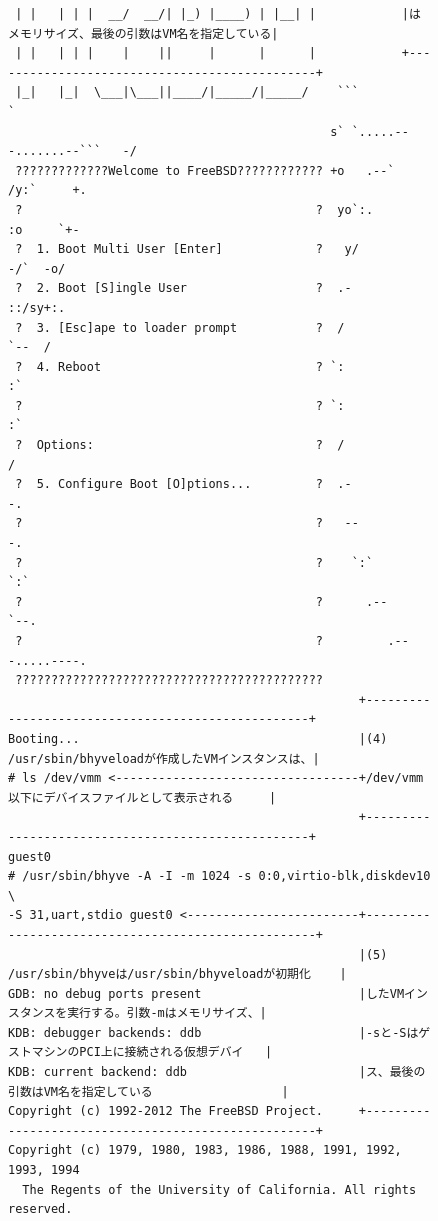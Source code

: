 \begin{figure}
{\begin{verbatim}
 | |   | | |  __/  __/| |_) |____) | |__| |            |はメモリサイズ、最後の引数はVM名を指定している|
 | |   | | |    |    ||     |      |      |            +----------------------------------------------+
 |_|   |_|  \___|\___||____/|_____/|_____/    ```                       `
                                             s` `.....---.......--```   -/
 ?????????????Welcome to FreeBSD???????????? +o   .--`         /y:`     +.
 ?                                         ?  yo`:.            :o     `+-
 ?  1. Boot Multi User [Enter]             ?   y/               -/`  -o/
 ?  2. Boot [S]ingle User                  ?  .-                  ::/sy+:.
 ?  3. [Esc]ape to loader prompt           ?  /                     `--  /
 ?  4. Reboot                              ? `:                          :`
 ?                                         ? `:                          :`
 ?  Options:                               ?  /                          /
 ?  5. Configure Boot [O]ptions...         ?  .-                        -.
 ?                                         ?   --                      -.
 ?                                         ?    `:`                  `:`
 ?                                         ?      .--             `--.
 ?                                         ?         .---.....----.
 ???????????????????????????????????????????
                                                 +---------------------------------------------------+
Booting...                                       |(4) /usr/sbin/bhyveloadが作成したVMインスタンスは、|
# ls /dev/vmm <----------------------------------+/dev/vmm以下にデバイスファイルとして表示される     |
                                                 +---------------------------------------------------+
guest0
# /usr/sbin/bhyve -A -I -m 1024 -s 0:0,virtio-blk,diskdev10 \
-S 31,uart,stdio guest0 <------------------------+----------------------------------------------------+
                                                 |(5) /usr/sbin/bhyveは/usr/sbin/bhyveloadが初期化    |
GDB: no debug ports present                      |したVMインスタンスを実行する。引数-mはメモリサイズ、|
KDB: debugger backends: ddb                      |-sと-SはゲストマシンのPCI上に接続される仮想デバイ   |
KDB: current backend: ddb                        |ス、最後の引数はVM名を指定している                  |
Copyright (c) 1992-2012 The FreeBSD Project.     +----------------------------------------------------+
Copyright (c) 1979, 1980, 1983, 1986, 1988, 1991, 1992, 1993, 1994
  The Regents of the University of California. All rights reserved.

\end{verbatim}}
\end{figure}
